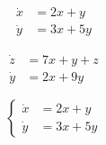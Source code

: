 \documentclass[a4paper, 12pt]{article}
\begin{document}
    \begin{equation} %
        \begin{split} %
            \dot x &= 2x + y\\ %
            \dot y &= 3x + 5y %
        \end{split}
    \end{equation}

    \begin{equation} %
        \begin{split} %
            \dot z &= 7x + y + z\\ %
            \dot y &= 2x + 9y %
        \end{split}
    \end{equation}


    \begin{equation}
        \left\{\begin{aligned} %
            \dot x &= 2x + y\\ %
            \dot y &= 3x + 5y %
        \end{aligned}\right.
    \end{equation}
\end{document}
